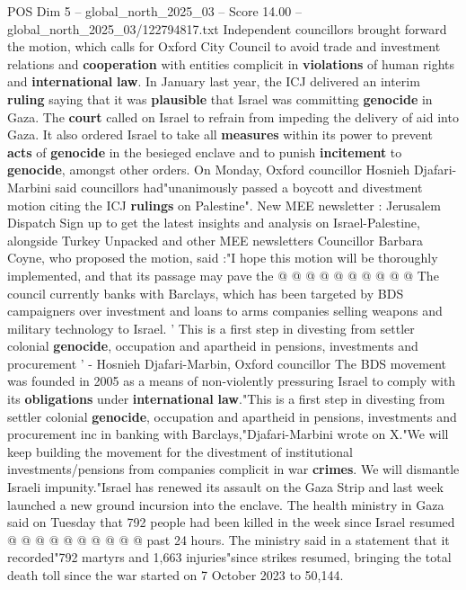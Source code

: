 \begin{textsample}{POS Dim 5 – global\_north\_2025\_03 – Score 14.00 – global\_north\_2025\_03/122794817.txt}  \label{ex:f5_pos_205}
Independent councillors brought forward the motion, which calls for Oxford City Council to avoid trade and investment relations and \textbf{cooperation} with entities complicit in \textbf{violations} of human rights and \textbf{international} \textbf{law}.
In January last year, the ICJ delivered an interim \textbf{ruling} saying that it was \textbf{plausible} that Israel was committing \textbf{genocide} in Gaza.
The \textbf{court} called on Israel to refrain from impeding the delivery of aid into Gaza.
It also ordered Israel to take all \textbf{measures} within its power to prevent \textbf{acts} of \textbf{genocide} in the besieged enclave and to punish \textbf{incitement} to \textbf{genocide}, amongst other orders.
On Monday, Oxford councillor Hosnieh Djafari-Marbini said councillors had"unanimously passed a boycott and divestment motion citing the ICJ \textbf{rulings} on Palestine".
New MEE newsletter : Jerusalem Dispatch Sign up to get the latest insights and analysis on Israel-Palestine, alongside Turkey Unpacked and other MEE newsletters Councillor Barbara Coyne, who proposed the motion, said :"I hope this motion will be thoroughly implemented, and that its passage may pave the @ @ @ @ @ @ @ @ @ @ The council currently banks with Barclays, which has been targeted by BDS campaigners over investment and loans to arms companies selling weapons and military technology to Israel. ' This is a first step in divesting from settler colonial \textbf{genocide}, occupation and apartheid in pensions, investments and procurement ' - Hosnieh Djafari-Marbin, Oxford councillor The BDS movement was founded in 2005 as a means of non-violently pressuring Israel to comply with its \textbf{obligations} under \textbf{international} \textbf{law}."This is a first step in divesting from settler colonial \textbf{genocide}, occupation and apartheid in pensions, investments and procurement inc in banking with Barclays,"Djafari-Marbini wrote on X."We will keep building the movement for the divestment of institutional investments/pensions from companies complicit in war \textbf{crimes}.
We will dismantle Israeli impunity."Israel has renewed its assault on the Gaza Strip and last week launched a new ground incursion into the enclave.
The health ministry in Gaza said on Tuesday that 792 people had been killed in the week since Israel resumed @ @ @ @ @ @ @ @ @ @ past 24 hours.
The ministry said in a statement that it recorded"792 martyrs and 1,663 injuries"since strikes resumed, bringing the total death toll since the war started on 7 October 2023 to 50,144.

\end{textsample}
